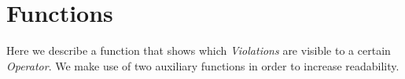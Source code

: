 \section{Functions}
Here we describe a function that shows which \emph{Violations} are visible to
a certain \emph{Operator}. We make use of two auxiliary functions in order to
increase readability.

